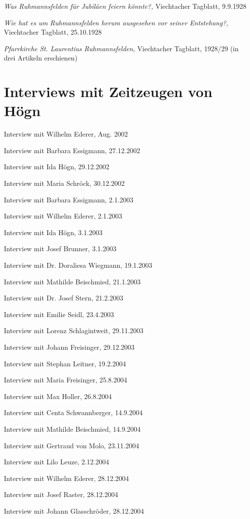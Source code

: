 \documentclass{book}
\begin{document}
\textit{Was Ruhmannsfelden für Jubiläen feiern könnte?,} Viechtacher
Tagblatt, 9.9.1928

\textit{Wie hat es um Ruhmannsfelden herum ausgesehen vor seiner
Entstehung?,} Viechtacher Tagblatt, 25.10.1928

\textit{Pfarrkirche St. Laurentius Ruhmannsfelden,} Viechtacher
Tagblatt, 1928/29 (in drei Artikeln erschienen)

\section{Interviews mit Zeitzeugen von Högn}

Interview mit Wilhelm Ederer, Aug. 2002

Interview mit Barbara Essigmann, 27.12.2002

Interview mit Ida Högn, 29.12.2002

Interview mit Maria Schröck, 30.12.2002

Interview mit Barbara Essigmann, 2.1.2003

Interview mit Wilhelm Ederer, 2.1.2003

Interview mit Ida Högn, 3.1.2003

Interview mit Josef Brunner, 3.1.2003

Interview mit Dr. Doraliesa Wiegmann, 19.1.2003

Interview mit Mathilde Beischmied, 21.1.2003

Interview mit Dr. Josef Stern, 21.2.2003

Interview mit Emilie Seidl, 23.4.2003

Interview mit Lorenz Schlagintweit, 29.11.2003

Interview mit Johann Freisinger, 29.12.2003

Interview mit Stephan Leitner, 19.2.2004

Interview mit Maria Freisinger, 25.8.2004

Interview mit Max Holler, 26.8.2004

Interview mit Centa Schwannberger, 14.9.2004

Interview mit Mathilde Beischmied, 14.9.2004

Interview mit Gertraud von Molo, 23.11.2004

Interview mit Lilo Leuze, 2.12.2004

Interview mit Wilhelm Ederer, 28.12.2004

Interview mit Josef Raster, 28.12.2004

Interview mit Johann Glasschröder, 28.12.2004
\end{document}
